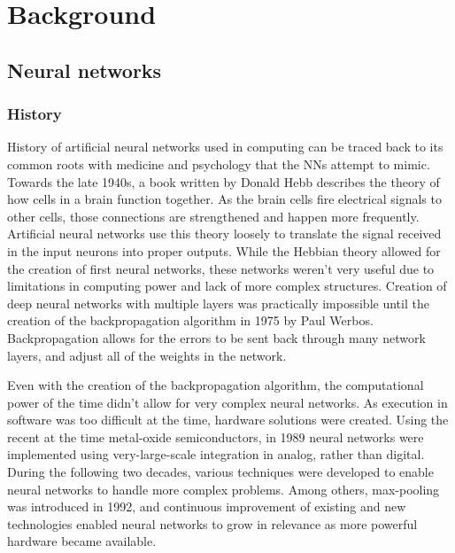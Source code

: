 \chapter{Background}


\section{Neural networks}


\subsection{History}


History of artificial neural networks used in computing can be traced back to its common roots with medicine and psychology that the NNs attempt to mimic. 
Towards the late 1940s, a book written by Donald Hebb \cite{hebb2005organization} describes the theory of how cells in a brain function together. 
As the brain cells fire electrical signals to other cells, those connections are strengthened and happen more frequently.
Artificial neural networks use this theory loosely to translate the signal received in the input neurons into proper outputs.
While the Hebbian theory allowed for the creation of first neural networks, these networks weren't very useful due to limitations in computing power and lack of more complex structures. 
Creation of deep neural networks with multiple layers was practically impossible until the creation of the backpropagation algorithm in 1975 by Paul Werbos\cite{werbos1975beyond}. 
Backpropagation allows for the errors to be sent back through many network layers, and adjust all of the weights in the network.


Even with the creation of the backpropagation algorithm, the computational power of the time didn't allow for very complex neural networks. 
As execution in software was too difficult at the time, hardware solutions were created. Using the recent at the time metal-oxide semiconductors, in 1989 neural networks were implemented using very-large-scale integration in analog, rather than digital\cite{mead2012analog}. 
During the following two decades, various techniques were developed to enable neural networks to handle more complex problems.
Among others, max-pooling was introduced in 1992\cite{cresceptron1992}, and continuous improvement of existing and new technologies enabled neural networks to grow in relevance as more powerful hardware became available.

